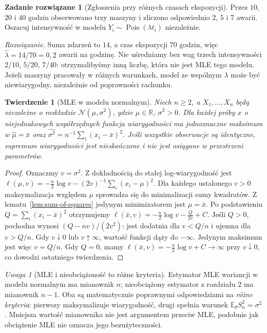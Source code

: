 \documentclass[11pt,a4paper,oneside]{report}
\numberwithin{equation}{chapter}
\theoremstyle{plain}
\newtheorem{twierdzenie}{Twierdzenie}[chapter]
\theoremstyle{definition}
\newtheorem{zadanie}{Zadanie rozwiązane}[chapter]
\theoremstyle{remark}
\newtheorem{uwaga}{Uwaga}[chapter]
\newcommand{\R}{\mathbb R}
\newcommand{\E}{\mathbb E}
\newcommand{\Normal}{\mathcal N}
\DeclareMathOperator{\Pois}{Pois}
\begin{document}
\begin{zadanie}[Zgłoszenia przy różnych czasach ekspozycji]
Przez $10$, $20$ i $40$ godzin obserwowano trzy maszyny i zliczono
odpowiednio $2$, $5$ i $7$ awarii. Oszacuj intensywność w modelu
$Y_i\sim\Pois(\lambda t_i)$ niezależnie.
\par\emph{Rozwiązanie.} Suma zdarzeń to $14$, a czas ekspozycji $70$
godzin, więc $\widehat\lambda=14/70=0{,}2$ awarii na godzinę.
Nie uśredniamy bez wag trzech intensywności $2/10$, $5/20$, $7/40$:
otrzymalibyśmy inną liczbę, która nie jest MLE tego modelu.
Jeżeli maszyny pracowały w różnych warunkach, model ze wspólnym
$\lambda$ może być niewiarygodny, niezależnie od poprawności rachunku.
\end{zadanie}

\begin{twierdzenie}[MLE w modelu normalnym]\label{thm:mle-normal}
Niech $n\ge2$, a $X_1,\ldots,X_n$ będą niezależne o rozkładzie
$\Normal(\mu,\sigma^2)$, gdzie $\mu\in\R$, $\sigma^2>0$. Dla każdej
próby $x$ o niejednakowych współrzędnych funkcja wiarygodności ma
jednoznaczne maksimum w
$\widehat\mu=\bar x$ oraz
$\widehat{\sigma^2}=n^{-1}\sum_i(x_i-\bar x)^2$.
Jeśli wszystkie obserwacje są identyczne, supremum wiarygodności jest
nieskończone i nie jest osiągane w przestrzeni parametrów.
\end{twierdzenie}
\begin{proof}
Oznaczmy $v=\sigma^2$. Z dokładnością do stałej log-wiarygodność jest
$\ell(\mu,v)=-\frac n2\log v-(2v)^{-1}\sum_i(x_i-\mu)^2$.
Dla każdego ustalonego $v>0$ maksymalizacja względem $\mu$ sprowadza się
do minimalizacji sumy kwadratów. Z lematu~\ref{lem:sum-of-squares}
jedynym minimizatorem jest $\mu=\bar x$. Po podstawieniu
$Q=\sum_i(x_i-\bar x)^2$ otrzymujemy
$\ell(\bar x,v)=-\frac n2\log v-\frac Q{2v}+C$.
Jeśli $Q>0$, pochodna wynosi $(Q-nv)/(2v^2)$: jest dodatnia dla
$v<Q/n$ i ujemna dla $v>Q/n$. Gdy $v\downarrow0$ lub $v\uparrow\infty$,
wartość funkcji dąży do $-\infty$. Jedynym maksimum jest więc $v=Q/n$.
Gdy $Q=0$, mamy $\ell(\bar x,v)=-\frac n2\log v+C\to\infty$
przy $v\downarrow0$, co dowodzi ostatniego twierdzenia.
\end{proof}

\begin{uwaga}[MLE i nieobciążoność to różne kryteria]
Estymator MLE wariancji w modelu normalnym ma mianownik $n$;
nieobciążony estymator z rozdziału 2 ma mianownik $n-1$.
Oba są matematycznie poprawnymi odpowiedziami na \emph{różne kryteria}:
pierwszy maksymalizuje wiarygodność, drugi spełnia warunek
$\E_\theta S_n^2=\sigma^2$. Mniejsza wartość mianownika nie jest
argumentem przeciw MLE, podobnie jak obciążenie MLE nie oznacza jego
bezużyteczności.
\end{uwaga}
\end{document}
